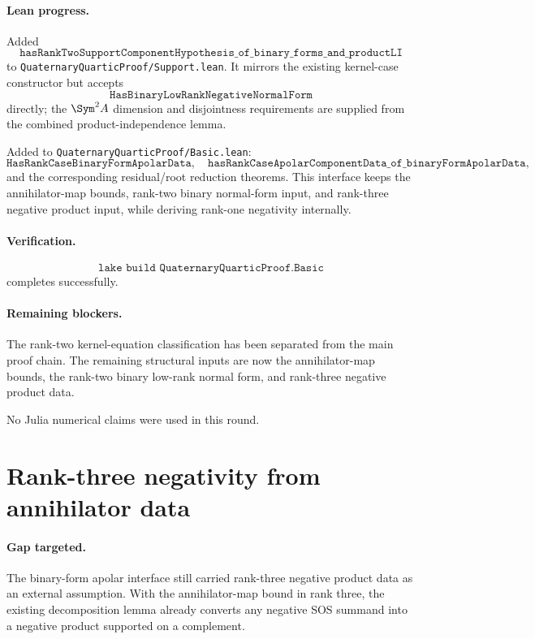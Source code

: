 \documentclass[11pt]{article}
\begin{document}
\paragraph{Lean progress.}
Added
\[
\texttt{hasRankTwoSupportComponentHypothesis\_of\_binary\_forms\_and\_productLI}
\]
to \texttt{QuaternaryQuarticProof/Support.lean}.  It mirrors the existing
kernel-case constructor but accepts
\[
\texttt{HasBinaryLowRankNegativeNormalForm}
\]
directly; the \(\Sym^2A\) dimension and disjointness requirements are supplied
from the combined product-independence lemma.

Added to \texttt{QuaternaryQuarticProof/Basic.lean}:
\[
\texttt{HasRankCaseBinaryFormApolarData},
\quad
\texttt{hasRankCaseApolarComponentData\_of\_binaryFormApolarData},
\]
and the corresponding residual/root reduction theorems.  This interface keeps
the annihilator-map bounds, rank-two binary normal-form input, and rank-three
negative product input, while deriving rank-one negativity internally.

\paragraph{Verification.}
\[
\texttt{lake build QuaternaryQuarticProof.Basic}
\]
completes successfully.

\paragraph{Remaining blockers.}
The rank-two kernel-equation classification has been separated from the main
proof chain.  The remaining structural inputs are now the annihilator-map
bounds, the rank-two binary low-rank normal form, and rank-three negative
product data.

No Julia numerical claims were used in this round.

\section*{Rank-three negativity from annihilator data}

\paragraph{Gap targeted.}
The binary-form apolar interface still carried rank-three negative product
data as an external assumption.  With the annihilator-map bound in rank three,
the existing decomposition lemma already converts any negative SOS summand
into a negative product supported on a complement.
\end{document}
